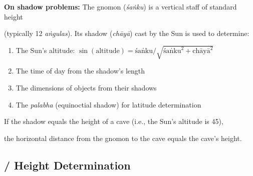 \documentclass[10pt,a4paper]{article}
\newenvironment{engcommentary}
\newcommand{\bilingualverse}[2]{%

\noindent\begin{minipage}[t]{0.47\textwidth}

\dev{#1}

\end{minipage}%

\hfill\vline\hfill%

\begin{minipage}[t]{0.47\textwidth}

#2

\end{minipage}\par\vspace{0.8em}%

}
\begin{document}



\begin{engcommentary}

\textbf{On shadow problems:} The gnomon (\textit{śaṅku}) is a vertical staff of standard height

(typically 12 \textit{aṅgulas}). Its shadow (\textit{chāyā}) cast by the Sun is used to determine:

\begin{enumerate}

\item The Sun's altitude: $\sin(\text{altitude}) = \text{śaṅku} / \sqrt{\text{śaṅku}^2 + \text{chāyā}^2}$

\item The time of day from the shadow's length

\item The dimensions of objects from their shadows

\item The \textit{palabha} (equinoctial shadow) for latitude determination

\end{enumerate}

If the shadow equals the height of a cave (i.e., the Sun's altitude is 45\textdegree),

the horizontal distance from the gnomon to the cave equals the cave's height.

\end{engcommentary}



\subsection*{ / Height Determination}



\end{document}
